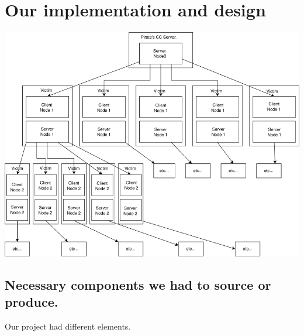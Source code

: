 \documentclass[../main.tex]{subfiles}
\begin{document}
	\chapter{Our implementation and design}

    \includegraphics[width=450pt]{botnet.png}

    \vspace{10pt}

    \section{Necessary components we had to source or produce.}

    Our project had different elements.
\end{document}
